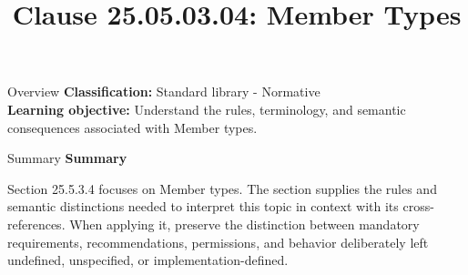 \documentclass[10pt,letterpaper]{article}
\title{Clause 25.05.03.04: Member Types}
\author{}
\date{}
\begin{document}
\maketitle
\begin{CornellOverviewBox}{Overview}
\textbf{Classification:} Standard library - Normative\\[2pt]
\textbf{Learning objective:} Understand the rules, terminology, and semantic consequences associated with Member types.
\end{CornellOverviewBox}\begin{CornellSummaryBox}{Summary}
{\sffamily\bfseries\color{Accent} Summary}\par\vspace{3pt}Section 25.5.3.4 focuses on Member types. The section supplies the rules and semantic distinctions needed to interpret this topic in context with its cross-references. When applying it, preserve the distinction between mandatory requirements, recommendations, permissions, and behavior deliberately left undefined, unspecified, or implementation-defined.
\end{CornellSummaryBox}
\end{document}
